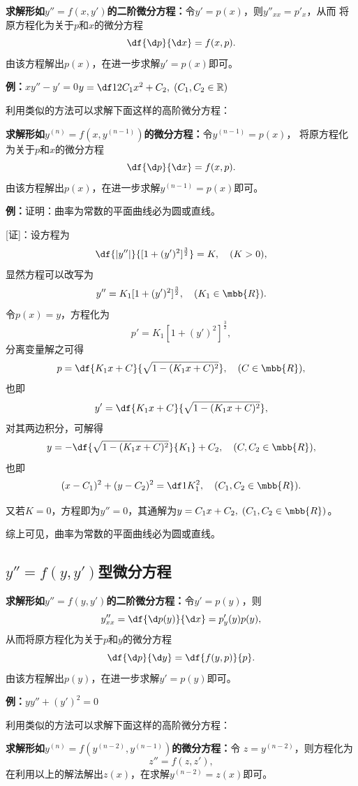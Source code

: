 \begin{thx}
	{\bf 求解形如$y''=f(x,y')$的二阶微分方程：}令$y'=p(x)$，则$y''_{xx}=p'_x$，从而
	将原方程化为关于$p$和$x$的微分方程
	$$\df{\d p}{\d x}=f(x,p).$$
	由该方程解出$p(x)$，在进一步求解$y'=p(x)$即可。
\end{thx}

{\bf 例：}$xy''-y'=0$\hfill $y=\df12C_1x^2+C_2,\;(C_1,C_2\in\mathbb{R})$

利用类似的方法可以求解下面这样的高阶微分方程：

\begin{thx}
	{\bf 求解形如$y^{(n)}=f(x,y^{(n-1)})$的微分方程：}令$y^{(n-1)}=p(x)$，
	将原方程化为关于$p$和$x$的微分方程
	$$\df{\d p}{\d x}=f(x,p).$$
	由该方程解出$p(x)$，在进一步求解$y^{(n-1)}=p(x)$即可。
\end{thx}

{\bf 例：}证明：曲率为常数的平面曲线必为圆或直线。

[证]：设方程为
$$\df{|y''|}{{[1+(y')^2]^{\frac32}}}=K,\quad (K>0),$$
显然方程可以改写为
$$y''=K_1[1+(y')^2]^{\frac32},\quad (K_1\in\mbb{R}).$$
令$p(x)=y$，方程化为
$$p'=K_1[1+(y')^2]^{\frac32},$$
分离变量解之可得
$$p=\df{K_1x+C}{\sqrt{1-(K_1x+C)^2}},\quad (C\in\mbb{R}),$$
也即
$$y'=\df{K_1x+C}{\sqrt{1-(K_1x+C)^2}},$$
对其两边积分，可解得
$$y=-\df{\sqrt{1-(K_1x+C)^2}}{K_1}+C_2,\quad(C,C_2\in\mbb{R}),$$
也即
$$(x-C_1)^2+(y-C_2)^2=\df1{K_1^2},\quad (C_1,C_2\in\mbb{R}).$$

又若$K=0$，方程即为$y''=0$，其通解为$y=C_1x+C_2,\;(C_1,C_2\in\mbb{R})$。

综上可见，曲率为常数的平面曲线必为圆或直线。\fin

\subsection{$y''=f(y,y')$型微分方程}

\begin{thx}
	{\bf 求解形如$y''=f(y,y')$的二阶微分方程：}令$y'=p(y)$，则
	$$y''_{xx}=\df{\d p(y)}{\d x}=p'_y(y)p(y),$$
	从而将原方程化为关于$p$和$y$的微分方程
	$$\df{\d p}{\d y}=\df{f(y,p)}{p}.$$
	由该方程解出$p(y)$，在进一步求解$y'=p(y)$即可。
\end{thx}

{\bf 例：}$yy''+(y')^2=0$

利用类似的方法可以求解下面这样的高阶微分方程：

\begin{thx}
	{\bf 求解形如$y^{(n)}=f(y^{(n-2)},y^{(n-1)})$的微分方程：}令
	$z=y^{(n-2)}$，则方程化为
	$$z''=f(z,z'),$$
	在利用以上的解法解出$z(x)$，在求解$y^{(n-2)}=z(x)$即可。
\end{thx}

